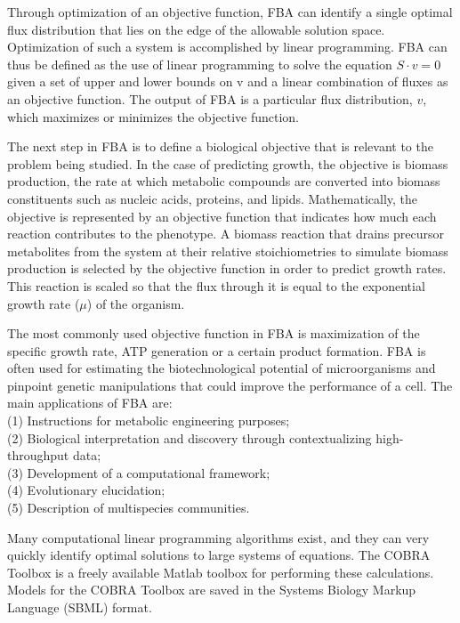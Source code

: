Through optimization of an objective function, FBA can identify a single optimal flux distribution 
that lies on the edge of the allowable solution space. Optimization of such a system is accomplished by linear 
programming. FBA can thus be defined as the use of linear programming to solve the equation $S\cdot v = 0$ 
given a set of upper and lower bounds on v and a linear combination of fluxes as an objective function. 
The output of FBA is a particular flux distribution, $v$, which maximizes or minimizes the objective function. \cite{Orth2010}

The next step in FBA is to define a biological objective that is relevant to the problem being studied. 
In the case of predicting growth, the objective is biomass production, the rate at which metabolic compounds 
are converted into biomass constituents such as nucleic acids, proteins, and lipids. Mathematically, 
the objective is represented by an objective function that indicates how much each reaction contributes to the phenotype. 
A biomass reaction that drains precursor metabolites from the system at their relative stoichiometries to simulate biomass production is 
selected by the objective function in order to predict growth rates. This reaction is scaled so that the flux through it is equal 
to the exponential growth rate ($\mu$) of the organism.  \cite{Orth2010}

The most commonly used objective function in FBA is maximization of the 
specific growth rate, ATP generation or a certain product formation. FBA is often used for estimating the biotechnological potential of 
microorganisms and pinpoint genetic manipulations that could improve the performance of a cell. The main applications of 
FBA are:\\
(1) Instructions for metabolic engineering purposes; \\
(2) Biological interpretation and discovery through 
contextualizing high-throughput data; \\
(3) Development of a computational framework; \\
(4) Evolutionary elucidation; \\
(5) Description of multispecies communities. \cite{Kerkhoven2014}

Many computational linear programming algorithms exist, and they can very quickly 
identify optimal solutions to large systems of equations. The COBRA Toolbox \cite{Becker2007} is a freely available Matlab 
toolbox for performing these calculations. Models for the COBRA Toolbox are saved in the Systems Biology Markup Language (SBML) \cite{Hucka2003} format.

